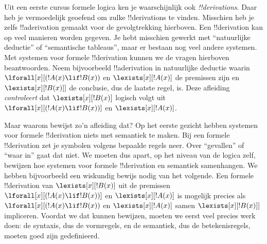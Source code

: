 \documentclass[../../../include/open-logic-section]{subfiles}
\begin{document}
Uit een eerste cursus formele logica ken je waarschijnlijk ook
\emph{!!{derivation}s}. Daar heb je vermoedelijk geoefend om zulke
!!{derivation}s te vinden. Misschien heb je zelfs !!a{derivation} gemaakt
voor de gevolgtrekking hierboven. Een !!{derivation} kan op veel manieren
worden gegeven. Je hebt misschien gewerkt met ``natuurlijke deductie''
of ``semantische tableaus'', maar er bestaan nog veel andere systemen.
Met systemen voor formele !!{derivation} kunnen we de vragen hierboven beantwoorden.
Neem bijvoorbeeld !!a{derivation} in natuurlijke deductie waarin
$\lforall[x][(!A(x) \lif !B(x))$ en $\lexists[x][!A(x)]$ de premissen
zijn en $\lexists[x][!B(x)]]$ de conclusie, dus de laatste regel, is.
Deze afleiding \emph{controleert} dat $\lexists[x][!B(x)]$ logisch volgt
uit $\lforall[x][(!A(x) \lif !B(x))]$ en $\lexists[x][!A(x)]$.

Maar waarom bewijst zo'n afleiding dat? Op het eerste gezicht hebben
systemen voor formele !!{derivation} niets met semantiek te maken. Bij een formele
!!{derivation} zet je symbolen volgens bepaalde regels neer. Over
``gevallen'' of ``waar in'' gaat dat niet. We moeten dus apart, op het
niveau van de logica zelf, bewijzen hoe systemen voor formele !!{derivation} en
semantiek samenhangen. We hebben bijvoorbeeld een wiskundig bewijs nodig
van het volgende. Een formele !!{derivation} van $\lexists[x][!B(x)]$
uit de premissen $\lforall[x][(!A(x) \lif !B(x))]$ en
$\lexists[x][!A(x)]$ is mogelijk precies als
$\lforall[x][(!A(x) \lif !B(x))$ en $\lexists[x][!A(x)]$ samen
$\lexists[x][!B(x)]]$ impliceren. Voordat we dat kunnen bewijzen, moeten
we eerst veel precies werk doen: de syntaxis, dus de vormregels, en de
semantiek, dus de betekenisregels, moeten goed zijn gedefinieerd.
\end{document}
